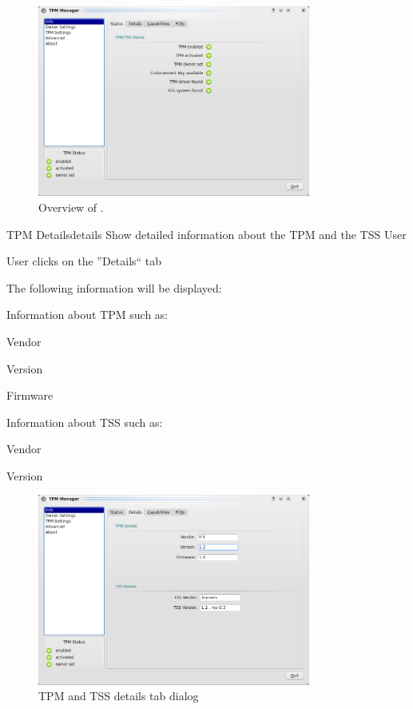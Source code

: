 \documentclass[
  american        %
]{sirrixreport}
\begin{document}
\begin{figure}[h]
\centering
\includegraphics[width=0.8\textwidth]{images/tpm_status}
\caption{Overview of .}
\end{figure}
\clearpage

\begin{usecase}{TPM Details}{details}
\ucdesc Show detailed information about the TPM and the TSS
\ucactors  User
\ucnormal 
 \item User clicks on the ''Details`` tab
 \item The following information will be displayed:
   \begin{compactitem}
   \item Information about TPM such as:
      \begin{compactitem}
         \item Vendor
         \item Version
         \item Firmware
      \end{compactitem}
   \item Information about TSS such as:
      \begin{compactitem}
         \item Vendor
         \item Version
      \end{compactitem}
   \end{compactitem}
\ucendflow 
\end{usecase}

\begin{figure}[h]
\centering
\includegraphics[width=0.8\textwidth]{images/tpm_details}
\caption{TPM and TSS details tab dialog } 
\end{figure}
\clearpage
\end{document}
